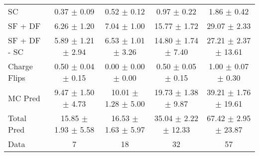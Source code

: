 \begin{tabular}{l|cccc}
                                 SC &  0.37 $\pm$  0.09 &  0.52 $\pm$  0.12 &  0.97 $\pm$  0.22 &  1.86 $\pm$  0.42 \\
                            SF + DF &  6.26 $\pm$  1.20 &  7.04 $\pm$  1.00 & 15.77 $\pm$  1.72 & 29.07 $\pm$  2.33 \\
\hline
                       SF + DF - SC &  5.89 $\pm$  1.21 $\pm$  2.94 &  6.53 $\pm$  1.01 $\pm$  3.26 & 14.80 $\pm$  1.74 $\pm$  7.40 & 27.21 $\pm$  2.37 $\pm$ 13.61 \\
\hline\hline
                       Charge Flips &  0.50 $\pm$  0.04 $\pm$  0.15 &  0.00 $\pm$  0.00 $\pm$  0.00 &  0.50 $\pm$  0.05 $\pm$  0.15 &  1.00 $\pm$  0.07 $\pm$  0.30 \\
\hline
                            MC Pred &  9.47 $\pm$  1.50 $\pm$  4.73 & 10.01 $\pm$  1.28 $\pm$  5.00 & 19.73 $\pm$  1.38 $\pm$  9.87 & 39.21 $\pm$  1.76 $\pm$ 19.61 \\
\hline
                         Total Pred & 15.85 $\pm$  1.93 $\pm$  5.58 & 16.53 $\pm$  1.63 $\pm$  5.97 & 35.04 $\pm$  2.22 $\pm$ 12.33 & 67.42 $\pm$  2.95 $\pm$ 23.87 \\
\hline\hline
                               Data &     7 &    18 &    32 &    57 \\
\hline\hline
\end{tabular}

